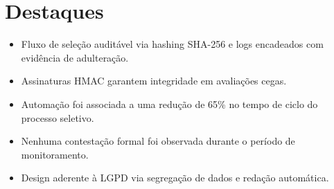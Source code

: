 \documentclass{article}
\begin{document}
\section*{Destaques}
\begin{itemize}
    \item Fluxo de sele\c{c}\~ao audit\'avel via hashing SHA-256 e logs encadeados com evid\^encia de adultera\c{c}\~ao.
    \item Assinaturas HMAC garantem integridade em avalia\c{c}\~oes cegas.
    \item Automa\c{c}\~ao foi associada a uma redu\c{c}\~ao de 65\% no tempo de ciclo do processo seletivo.
    \item Nenhuma contesta\c{c}\~ao formal foi observada durante o per\'iodo de monitoramento.
    \item Design aderente \`a LGPD via segrega\c{c}\~ao de dados e reda\c{c}\~ao autom\'atica.
\end{itemize}
\end{document}
